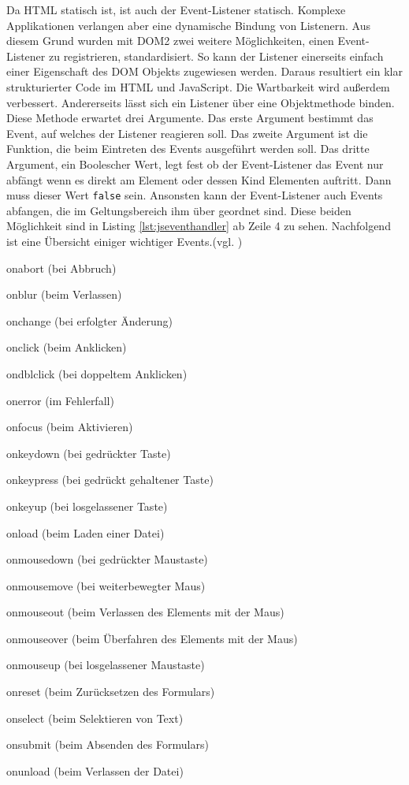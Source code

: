 Da HTML statisch ist, ist auch der Event-Listener statisch. Komplexe Applikationen verlangen aber eine dynamische Bindung von Listenern. Aus diesem Grund wurden mit DOM2 zwei weitere Möglichkeiten, einen Event-Listener zu registrieren, standardisiert. So kann der Listener einerseits einfach einer Eigenschaft des DOM Objekts zugewiesen werden. Daraus resultiert ein klar strukturierter Code im HTML und JavaScript. Die Wartbarkeit wird außerdem verbessert. Andererseits lässt sich ein Listener über eine Objektmethode binden. Diese Methode erwartet drei Argumente. Das erste Argument bestimmt das Event, auf welches der Listener reagieren soll. Das zweite Argument ist die Funktion, die beim Eintreten des Events ausgeführt werden soll. Das dritte Argument, ein Boolescher Wert, legt fest ob der Event-Listener das Event nur abfängt wenn es direkt am Element oder dessen Kind Elementen auftritt. Dann muss dieser Wert \texttt{false} sein. Ansonsten kann der Event-Listener auch Events abfangen, die im Geltungsbereich ihm über geordnet sind. Diese beiden Möglichkeit sind in Listing \ref{lst:jseventhandler} ab Zeile 4 zu sehen. Nachfolgend ist eine Übersicht einiger wichtiger Events.(vgl. \cite[S.428ff]{FlanJava2007})

\vspace{1em}
\begin{compactitem}
  \item onabort (bei Abbruch)
	\item onblur (beim Verlassen)
	\item onchange (bei erfolgter Änderung)
	\item onclick (beim Anklicken)
	\item ondblclick (bei doppeltem Anklicken)
	\item onerror (im Fehlerfall)
	\item onfocus (beim Aktivieren)
	\item onkeydown (bei gedrückter Taste)
	\item onkeypress (bei gedrückt gehaltener Taste)
	\item onkeyup (bei losgelassener Taste)
	\item onload (beim Laden einer Datei)
	\item onmousedown (bei gedrückter Maustaste)
	\item onmousemove (bei weiterbewegter Maus)
	\item onmouseout (beim Verlassen des Elements mit der Maus)
	\item onmouseover (beim Überfahren des Elements mit der Maus)
	\item onmouseup (bei losgelassener Maustaste)
	\item onreset (beim Zurücksetzen des Formulars)
	\item onselect (beim Selektieren von Text)
	\item onsubmit (beim Absenden des Formulars)
	\item onunload (beim Verlassen der Datei)
\end{compactitem}

